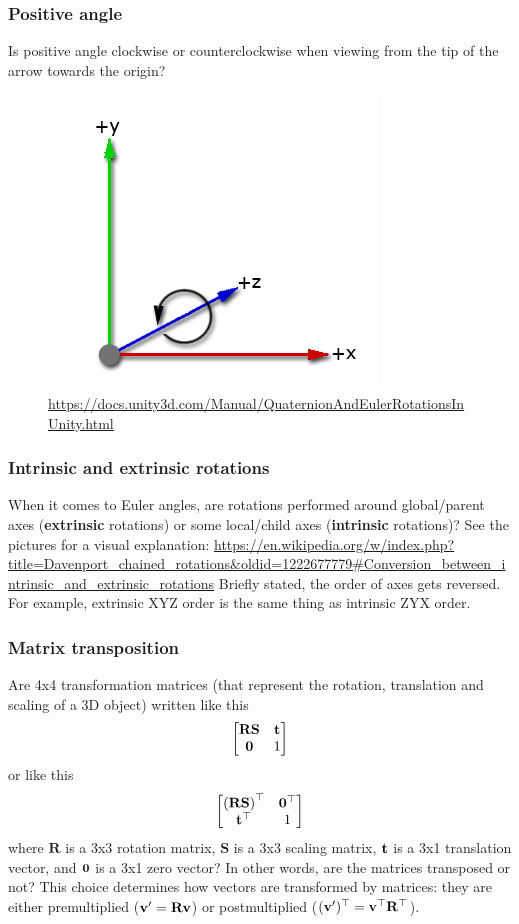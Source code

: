 \documentclass{beamer}
\begin{document}
\begin{frame}
\frametitle{Positive angle}
Is positive angle clockwise or counterclockwise when viewing from the tip of the arrow towards the origin?
\begin{figure}
    \centering
    \includegraphics[width=0.7\textheight]{assets/unity-axis-with-rotation_positive_angle.png}
	\caption*{\url{https://docs.unity3d.com/Manual/QuaternionAndEulerRotationsInUnity.html}}
\end{figure}
\end{frame}



\begin{frame}
\frametitle{Intrinsic and extrinsic rotations}
When it comes to Euler angles, are rotations performed around global/parent axes (\textbf{extrinsic} rotations) or some local/child axes (\textbf{intrinsic} rotations)?
\vfill 	
See the pictures for a visual explanation:
\url{https://en.wikipedia.org/w/index.php?title=Davenport_chained_rotations&oldid=1222677779\#Conversion_between_intrinsic_and_extrinsic_rotations}
\vfill 	
Briefly stated, the order of axes gets reversed. For example, extrinsic XYZ order is the same thing as intrinsic ZYX order. 
\end{frame}

\begin{frame}
\frametitle{Matrix transposition}
Are 4x4 transformation matrices (that represent the rotation, translation and scaling of a 3D object) written like this
$$
\begin{bmatrix}
\mathbf{RS} & \vv{t} \\
\vv{0} & 1	
\end{bmatrix}
$$
or like this
$$
\begin{bmatrix}
\mathbf{(RS)}^\top & \vv{0}^\top \\
\vv{t}^\top & 1
\end{bmatrix}
$$
where $\mathbf{R}$ is a 3x3 rotation matrix,  $\mathbf{S}$ is a 3x3 scaling matrix, $\vv{t}$ is a 3x1 translation vector, and $\vv{0}$ is a 3x1 zero vector? In other words, are the matrices transposed or not? 
\vfill
This choice determines how vectors are transformed by matrices: they are either premultiplied ($\vv{v'}=\mathbf{R}\vv{v}$) or postmultiplied ($(\vv{v'})^\top=\vv{v}^\top\mathbf{R}^\top$). 
\end{frame}
\end{document}
